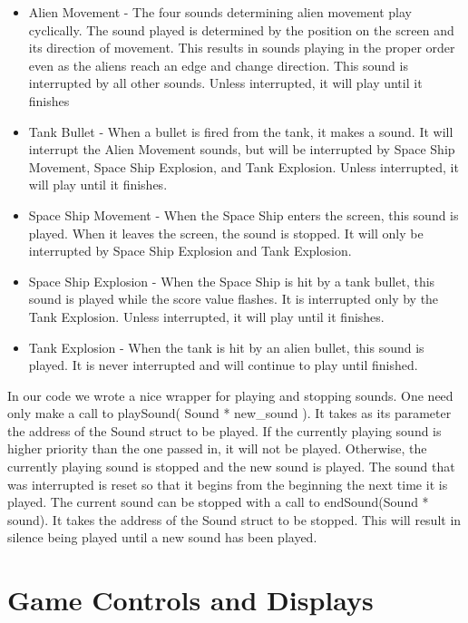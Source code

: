 \documentclass[11pt,letter,oneside]{report}
\begin{document}
\begin{itemize}
\item Alien Movement - The four sounds determining alien movement play cyclically.  The sound played is determined by the position on the screen and its direction of movement.  This results in sounds playing in the proper order even as the aliens reach an edge and change direction.  This sound is interrupted by all other sounds.  Unless interrupted, it will play until it finishes
\item Tank Bullet - When a bullet is fired from the tank, it makes a sound.  It will interrupt the Alien Movement sounds, but will be interrupted by Space Ship Movement, Space Ship Explosion, and Tank Explosion.  Unless interrupted, it will play until it finishes.
\item Space Ship Movement - When the Space Ship enters the screen, this sound is played.  When it leaves the screen, the sound is stopped.  It will only be interrupted by Space Ship Explosion and Tank Explosion.
\item Space Ship Explosion - When the Space Ship is hit by a tank bullet, this sound is played while the score value flashes.  It is interrupted only by the Tank Explosion.  Unless interrupted, it will play until it finishes.
\item Tank Explosion - When the tank is hit by an alien bullet, this sound is played.  It is never interrupted and will continue to play until finished.
\end{itemize}

In our code we wrote a nice wrapper for playing and stopping sounds.  One need only make a call to playSound( Sound * new\_sound ).  It takes as its parameter the address of the Sound struct to be played.  If the currently playing sound is higher priority than the one passed in, it will not be played.  Otherwise, the currently playing sound is stopped and the new sound is played.  The sound that was interrupted is reset so that it begins from the beginning the next time it is played.  The current sound can be stopped with a call to endSound(Sound * sound).  It takes the address of the Sound struct to be stopped.  This will result in silence being played until a new sound has been played.





\chapter{Game Controls and Displays}
\end{document}
